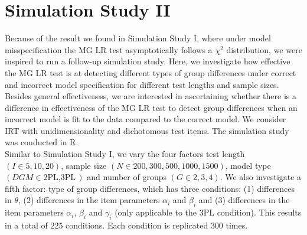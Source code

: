 \documentclass[Royal,sageapa,times,doublespace]{sagej}
\begin{document}
\section{\centering Simulation Study II}
Because of the result we found in Simulation Study I, where under model misspecification the MG LR test asymptotically follows a $\chi^2$ distribution, we were inspired to run a follow-up simulation study. Here, we investigate how effective the MG LR test is at detecting different types of group differences under correct and incorrect model specification for different test lengths and sample sizes. Besides general effectiveness, we are interested in ascertaining whether there is a difference in effectiveness of the MG LR test to detect group differences when an incorrect model is fit to the data compared to the correct model. We consider IRT with unidimensionality and dichotomous test items. The simulation study was conducted in R. \\
\indent Similar to Simulation Study I, we vary the four factors test length $(I \in{5, 10, 20})$, sample size $(N \in{200, 300, 500, 1000, 1500})$, model type $(DGM \in{\text{2PL}, \text{3PL}})$ and number of groups $(G \in{2, 3, 4})$. We also investigate a fifth factor: type of group differences, which has three conditions: (1) differences in $\theta$, (2) differences in the item parameters $\alpha_i$ and $\beta_i$ and (3) differences in the item parameters $\alpha_i$, $\beta_i$ and $\gamma_i$ (only applicable to the 3PL condition). This results in a total of $225$ conditions. Each condition is replicated $300$ times. \\
\end{document}
